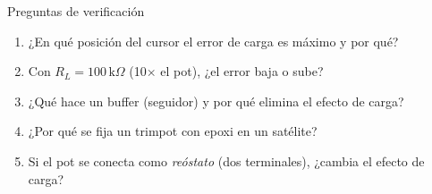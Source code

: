\documentclass[aspectratio=169]{beamer}
\begin{document}
\begin{frame}{Preguntas de verificación}
  \begin{enumerate}
    \item ¿En qué posición del cursor el error de carga es máximo y por qué?
    \item Con $R_L = 100\,\text{k}\Omega$ (10$\times$ el pot), ¿el error baja o sube?
    \item ¿Qué hace un buffer (seguidor) y por qué elimina el efecto de carga?
    \item ¿Por qué se fija un trimpot con epoxi en un satélite?
    \item Si el pot se conecta como \emph{reóstato} (dos terminales), ¿cambia el efecto de carga?
  \end{enumerate}
\end{frame}
\end{document}
